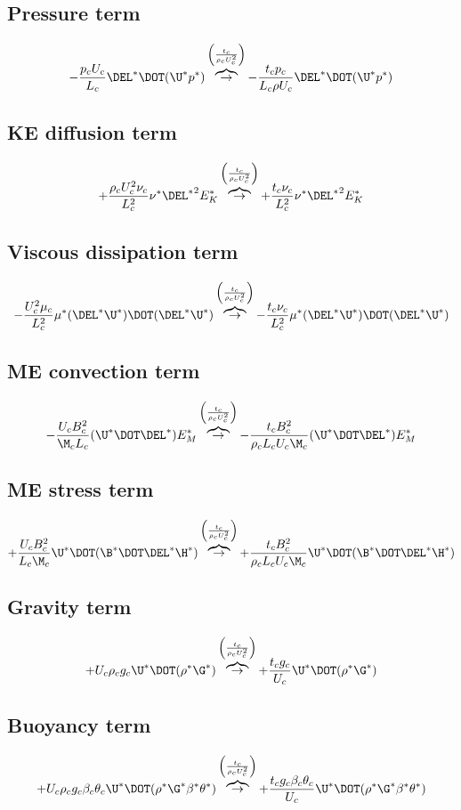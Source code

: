\documentclass[11pt]{article}
\newcommand{\OB}{\overbrace{\rightarrow}^{\left(\frac{t_c}{\rho_c U_c^2}\right)}}
\begin{document}
\subsection{Pressure term}
\begin{equation}
	- \frac{p_c U_c}{L_c} \DEL^* \DOT (\U^* p^*)
	\OB
	- \frac{t_c p_c}{L_c \rho U_c} \DEL^* \DOT (\U^* p^*)
\end{equation}
\subsection{KE diffusion term}
\begin{equation}
	+ \frac{\rho_c U_c^2 \nu_c}{L_c^2} \nu^* {\DEL^*}^2 E_K^*
	\OB
	+ \frac{t_c \nu_c}{L_c^2} \nu^* {\DEL^*}^2 E_K^*
\end{equation}
\subsection{Viscous dissipation term}
\begin{equation}
	- \frac{U_c^2 \mu_c}{L_c^2} \mu^* (\DEL^* \U^*) \DOT (\DEL^* \U^*)
	\OB
	- \frac{t_c \nu_c}{L_c^2} \mu^* (\DEL^* \U^*) \DOT (\DEL^* \U^*)
\end{equation}
\subsection{ME convection term}
\begin{equation}
	- \frac{U_c B_c^2}{\M_c L_c} (\U^* \DOT \DEL^*) E_M^*
	\OB
	- \frac{t_c B_c^2}{\rho_c L_c U_c \M_c} (\U^* \DOT \DEL^*) E_M^*
\end{equation}
\subsection{ME stress term}
\begin{equation}
	+ \frac{U_c B_c^2}{L_c \M_c} \U^* \DOT (\B^* \DOT \DEL^* \H^*)
	\OB
	+ \frac{t_c B_c^2}{\rho_c L_c U_c \M_c} \U^* \DOT (\B^* \DOT \DEL^* \H^*)
\end{equation}
\subsection{Gravity term}
\begin{equation}
	+ U_c \rho_c g_c \U^* \DOT (\rho^* \G^*)
	\OB
	+ \frac{t_c g_c}{U_c} \U^* \DOT (\rho^* \G^*)
\end{equation}
\subsection{Buoyancy term}
\begin{equation}
	+ U_c \rho_c g_c \beta_c \theta_c \U^* \DOT (\rho^* \G^* \beta^* \theta^*)
	\OB
	+ \frac{t_c g_c \beta_c \theta_c}{U_c} \U^* \DOT (\rho^* \G^* \beta^* \theta^*)
\end{equation}
\end{document}
